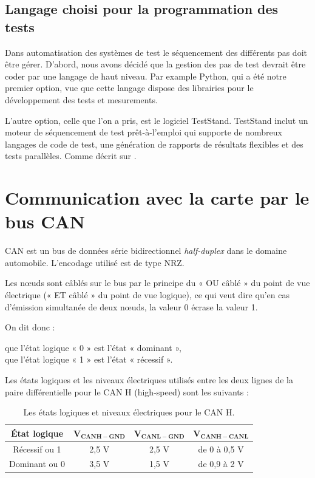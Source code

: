 \subsection{Langage choisi pour la programmation des tests}

Dans automatisation des systèmes de test le séquencement des différents pas doit être gérer. D'abord, nous avons décidé que la gestion des pas de test devrait être coder par une langage de haut niveau. Par example Python, qui a été notre premier option, vue que cette langage dispose des librairies pour le développement des tests et mesurements.  

L'autre option, celle que l'on a pris, est le logiciel TestStand. TestStand inclut un moteur de séquencement de test prêt-à-l'emploi qui supporte de nombreux langages de code de test, une génération de rapports de résultats flexibles et des tests parallèles. Comme décrit sur \cite{website1}.


\section{Communication avec la carte par le bus CAN}

CAN est un bus de données série bidirectionnel \textit{half-duplex} dans le domaine automobile. L'encodage utilisé est de type NRZ.

Les nœuds sont câblés sur le bus par le principe du « OU câblé » du point de vue électrique (« ET câblé » du point de vue logique), ce qui veut dire qu'en cas d'émission simultanée de deux nœuds, la valeur 0 écrase la valeur 1.

On dit donc :

que l'état logique « 0 » est l'état « dominant »,\\
que l'état logique « 1 » est l'état « récessif ».

Les états logiques et les niveaux électriques utilisés entre les deux lignes de la paire différentielle pour le CAN H (high-speed) sont les suivants :


\begin{table}[H]
\centering
\caption{Les états logiques et niveaux électriques pour le CAN H.}
\label{tab:niveau-electriques-CAN-H}
\begin{tabular}{|c|c|c|c|}
\hline
\textbf{État logique} 	& $\mathbf{V_{CANH-GND}}$ & $\mathbf{V_{CANL-GND}}$ & $\mathbf{V_{CANH-CANL}}$ \\
\hline
    Récessif ou 1      	&     2,5 V     &      2,5 V    &     de 0 à 0,5 V      \\
\hline
    Dominant ou 0      	&     3,5 V     &      1,5 V    &     de 0,9 à 2 V      \\ 
\hline
\end{tabular}
\end{table}

